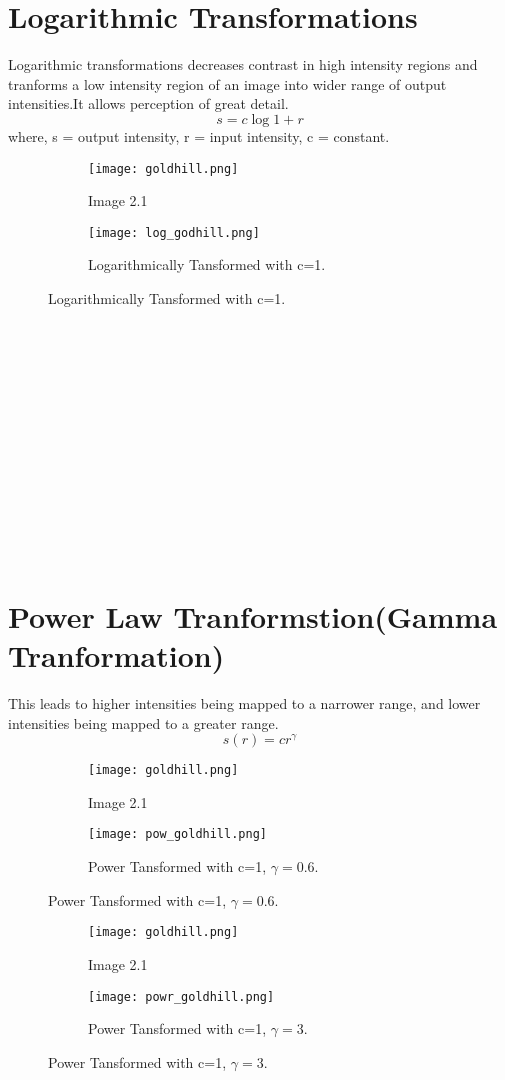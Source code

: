 \documentclass{report}
\begin{document}
\section{Logarithmic Transformations}
Logarithmic transformations decreases contrast in high intensity regions and tranforms a low intensity region of an image into wider range of output intensities.It allows perception of great detail.
\[ s = c\log{1+r} \] where, s = output intensity, r = input intensity, c = constant.
\begin{figure}[t]
    \begin{subfigure}{0.4\textwidth}
    \centering
    \texttt{[image: goldhill.png]}
    \caption{Image 2.1}
    \end{subfigure}
    \begin{subfigure}{0.4\textwidth}
    \centering
    \texttt{[image: log\_godhill.png]}
    \caption{Logarithmically Tansformed with c=1.}
    \end{subfigure}
\end{figure}
\\ \\ \\ \\ \\ \\ \\ \\ \\ \\ \\ \\
\section{Power Law Tranformstion(Gamma Tranformation)}
This leads to higher intensities being mapped to a narrower range, and lower intensities being mapped to a greater range.
\[s(r) = cr^\gamma\]
\begin{figure}[h]
    \begin{subfigure}{0.4\textwidth}
    \centering
    \texttt{[image: goldhill.png]}
    \caption{Image 2.1}
    \end{subfigure}
    \begin{subfigure}{0.4\textwidth}
    \centering
    \texttt{[image: pow\_goldhill.png]}
    \caption{Power Tansformed with c=1, $\gamma=0.6$.}
    \end{subfigure}
\end{figure}
\begin{figure}[h]
    \begin{subfigure}{0.4\textwidth}
    \centering
    \texttt{[image: goldhill.png]}
    \caption{Image 2.1}
    \end{subfigure}
    \begin{subfigure}{0.4\textwidth}
    \centering
    \texttt{[image: powr\_goldhill.png]}
    \caption{Power Tansformed with c=1, $\gamma=3$.}
    \end{subfigure}
\end{figure}
\end{document}
